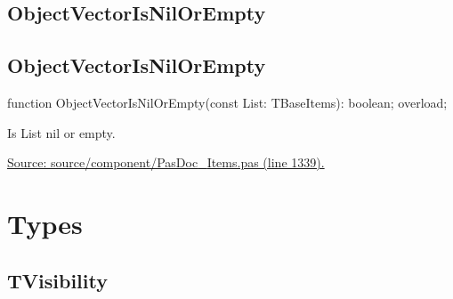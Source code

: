 \documentclass{report}
\newif\ifpdf
\begin{document}
\subsection*{\large{\textbf{ObjectVectorIsNilOrEmpty}}\normalsize\hspace{1ex}\hrulefill}
\else
\subsection*{ObjectVectorIsNilOrEmpty}
\fi
\label{PasDoc_Items-ObjectVectorIsNilOrEmpty}
\begin{list}{}{
\setlength{\itemindent}{0cm}
\setlength{\listparindent}{0cm}
\setlength{\leftmargin}{\evensidemargin}
\addtolength{\leftmargin}{\tmplength}
\settowidth{\labelsep}{X}
\addtolength{\leftmargin}{\labelsep}
\setlength{\labelwidth}{\tmplength}
}
\item[\textbf{Declaration}\hfill]
\ifpdf
\begin{flushleft}
\fi
\begin{ttfamily}
function ObjectVectorIsNilOrEmpty(const List: TBaseItems): boolean; overload;\end{ttfamily}

\ifpdf
\end{flushleft}
\fi

\par
\item[\textbf{Description}]
Is List nil or empty.\par
\href{https://github.com/pasdoc/pasdoc/blob/master/source/component/PasDoc_Items.pas#L1339}{Source: source/component/PasDoc{\_}Items.pas (line 1339).}

\end{list}
\section{Types}
\ifpdf
\subsection*{\large{\textbf{TVisibility}}\normalsize\hspace{1ex}\hrulefill}
\else
\end{document}
